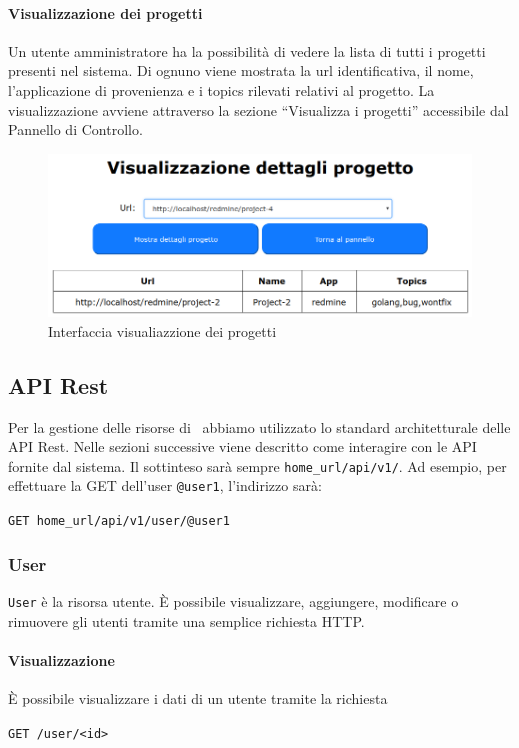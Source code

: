 \paragraph{Visualizzazione dei progetti}
Un utente amministratore ha la possibilità di vedere la lista di tutti i progetti presenti nel sistema. Di ognuno viene mostrata la url identificativa, il nome, l'applicazione di provenienza e i topics rilevati relativi al progetto.
La visualizzazione avviene attraverso la sezione ``Visualizza i progetti'' accessibile dal Pannello di Controllo.
\begin{figure}[H]
	\centering
	\includegraphics[width=12cm]{img/visualizzaprog.png}
	\caption{Interfaccia visualiazzione dei progetti}
\end{figure}


\subsection{API Rest}\label{APIRest}
\newcommand{\homeUrl}{home\_url}

Per la gestione delle risorse di \progetto\ abbiamo utilizzato lo standard architetturale delle API Rest.
Nelle sezioni successive viene descritto come interagire con le API fornite dal sistema.
Il  sottinteso sarà sempre \texttt{\homeUrl/api/v1/}.
Ad esempio, per effettuare la GET dell'user \texttt{@user1}, l'indirizzo sarà:
\begin{center}
    \texttt{GET \homeUrl/api/v1/user/@user1}
\end{center}

\subsubsection{User}

\texttt{User} è la risorsa utente.
È possibile visualizzare, aggiungere, modificare o rimuovere gli utenti tramite una semplice
richiesta HTTP.

\paragraph{Visualizzazione}
È possibile visualizzare i dati di un utente tramite la richiesta
    \begin{center}
        \texttt{GET  /user/<id>}
    \end{center}

